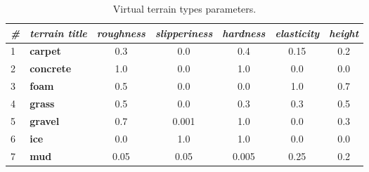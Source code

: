 \begin{table}[H]
\centering
\caption{Virtual terrain types parameters.}
\label{tab:terrains_parameters}
\begin{tabular}{|l|l|c|c|c|c|c|}
\hline
\textit{\#}                                       & \textit{terrain title} & \multicolumn{1}{l|}{\textit{roughness}} & \multicolumn{1}{l|}{\textit{slipperiness}} & \multicolumn{1}{l|}{\textit{hardness}} & \multicolumn{1}{l|}{\textit{elasticity}} & \multicolumn{1}{l|}{\textit{height}} \\ \hline
\cellcolor[HTML]{876496}1                         & \textbf{carpet}        & 0.3                                     & 0.0                                        & 0.4                                    & 0.15                                     & 0.2                                  \\ \hline
\cellcolor[HTML]{9C9FA6}2                         & \textbf{concrete}      & 1.0                                     & 0.0                                        & 1.0                                    & 0.0                                      & 0.0                                  \\ \hline
\cellcolor[HTML]{DCE696}3                         & \textbf{foam}          & 0.5                                     & 0.0                                        & 0.0                                    & 1.0                                      & 0.7                                  \\ \hline
\cellcolor[HTML]{239614}4                         & \textbf{grass}         & 0.5                                     & 0.0                                        & 0.3                                    & 0.3                                      & 0.5                                  \\ \hline
\cellcolor[HTML]{737F9C}5                         & \textbf{gravel}        & 0.7                                     & 0.001                                      & 1.0                                    & 0.0                                      & 0.3                                  \\ \hline
\cellcolor[HTML]{D7E3FF}6                         & \textbf{ice}           & 0.0                                     & 1.0                                        & 1.0                                    & 0.0                                      & 0.0                                  \\ \hline
\cellcolor[HTML]{646464}7                         & \textbf{mud}           & 0.05                                    & 0.05                                       & 0.005                                  & 0.25                                     & 0.2                                  \\ \hline

\end{tabular}
\end{table}
